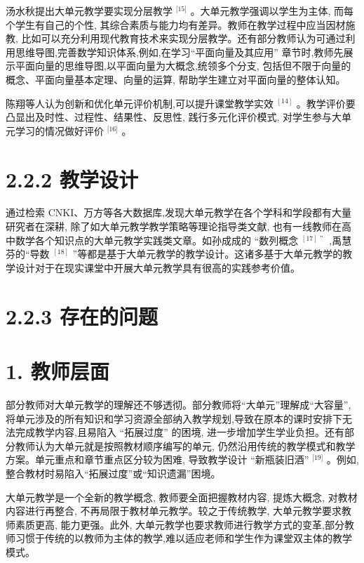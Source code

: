 \documentclass[10pt]{article}
\begin{document}
汤水秋提出大单元教学要实现分层教学 \({}^{\lbrack {15}\rbrack }\) 。大单元教学强调以学生为主体, 而每个学生有自己的个性, 其综合素质与能力均有差异。教师在教学过程中应当因材施教, 比如可以充分利用现代教育技术来实现分层教学。还有部分教师认为可通过利用思维导图,完善数学知识体系,例如,在学习“平面向量及其应用” 章节时,教师先展示平面向量的思维导图,以平面向量为大概念,统领多个分支, 包括但不限于向量的概念、平面向量基本定理、向量的运算, 帮助学生建立对平面向量的整体认知。

陈翔等人认为创新和优化单元评价机制,可以提升课堂教学实效 \({}^{\left\lbrack  {14}\right\rbrack  }\) 。教学评价要凸显出及时性、过程性、结果性、反思性, 践行多元化评价模式, 对学生参与大单元学习的情况做好评价 \({}^{\lbrack {16}\rbrack }\) 。

\section*{2.2.2 教学设计}

通过检索 CNKI、万方等各大数据库,发现大单元教学在各个学科和学段都有大量研究者在深耕, 除了如大单元教学教学策略等理论指导类文献, 也有一线教师在高中数学各个知识点的大单元教学实践类文章。如孙成成的 “数列概念 \({}^{\left\lbrack  {17}\right\rbrack  \text{ ” }}\) ,禹慧芬的“导数 \({}^{\left\lbrack  {18}\right\rbrack  }\) ”等都是基于大单元教学的教学设计。这诸多基于大单元教学的教学设计对于在现实课堂中开展大单元教学具有很高的实践参考价值。

\section*{2.2.3 存在的问题}

\section*{1. 教师层面}

部分教师对大单元教学的理解还不够透彻。部分教师将“大单元”理解成“大容量”,将单元涉及的所有知识和学习资源全部纳入教学规划,导致在原本的课时安排下无法完成教学内容,且易陷入 “拓展过度” 的困境, 进一步增加学生学业负担。还有部分教师认为大单元就是按照教材顺序编写的单元, 仍然沿用传统的教学模式和教学方案。单元重点和章节重点区分较为困难, 导致教学设计 “新瓶装旧酒” \({}^{\lbrack {19}\rbrack }\) 。例如,整合教材时易陷入“拓展过度”或“知识遗漏”困境。

大单元教学是一个全新的教学概念, 教师要全面把握教材内容, 提炼大概念, 对教材内容进行再整合, 不再局限于教材单元教学。较之于传统教学, 大单元教学要求教师素质更高, 能力更强。此外, 大单元教学也要求教师进行教学方式的变革,部分教师习惯于传统的以教师为主体的教学,难以适应老师和学生作为课堂双主体的教学模式。
\end{document}
